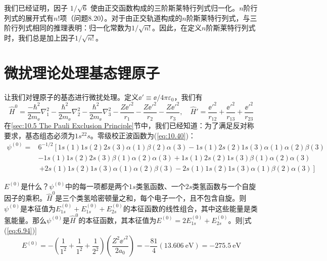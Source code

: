     我们已经证明，因子 $1/\sqrt{6}$ 使由正交函数构成的三阶斯莱特行列式归一化。$n$阶行列式的展开式有$n!$项（问题8.20）。对于由正交轨道构成的$n$阶斯莱特行列式，与三阶行列式相同的推理表明：归一化常数为$1/\sqrt{n!}$。因此，在定义$n$阶斯莱特行列式时，我们总是加上因子$1/\sqrt{n!}$。

\section{微扰理论处理基态锂原子}
\label{sec:10.7 Perturbation Treatment of the Lithium Ground State}

    让我们对锂原子的基态进行微扰处理。定义$\ee ' \equiv \ee / 4\pi \varepsilon_0$，我们有
    \begin{equation*}
        \hat{H}^0 = \frac{-\hbar^2}{2m_{\ee }}\nabla_1^2 - \frac{\hbar^2}{2m_{\ee }}\nabla_2^2 - \frac{\hbar^2}{2m_{\ee }}\nabla_3^2 - \frac{Z\ee '^2}{r_{1}} - \frac{Z\ee '^2}{r_{2}} - \frac{Z\ee '^2}{r_{3}}, \quad \hat{H}' = \frac{\ee '^2}{r_{12}} + \frac{\ee '^2}{r_{13}} + \frac{\ee '^2}{r_{23}}
    \end{equation*}
    在\ref{sec:10.5 The Pauli Exclusion Principle}节中，我们已经知道：为了满足反对称要求，基态组态必须为$1s^22s$。零级校正波函数为(\ref{eq:10.40})：
    \begin{equation}
        \begin{aligned}
            \psi^{\left(0\right)} = &6^{-1/2} \left[1s\left(1\right)1s\left(2\right)2s\left(3\right)\alpha\left(1\right)\beta\left(2\right)\alpha\left(3\right) - 1s\left(1\right)2s\left(2\right)1s\left(3\right)\alpha\left(1\right)\alpha\left(2\right)\beta\left(3\right)\right. \\
            &- 1s\left(1\right)1s\left(2\right)2s\left(3\right)\beta\left(1\right)\alpha\left(2\right)\alpha\left(3\right) + 1s\left(1\right)2s\left(2\right)1s\left(3\right)\beta\left(1\right)\alpha\left(2\right)\alpha\left(3\right) \\
            &\, \left. + 2s\left(1\right)1s\left(2\right)1s\left(3\right)\alpha\left(1\right)\alpha\left(2\right)\beta\left(3\right) - 2s\left(1\right)1s\left(2\right)1s\left(3\right)\alpha\left(1\right)\beta\left(2\right)\alpha\left(3\right)\right]
            \label{eq:10.48}
        \end{aligned}
    \end{equation}

    $E^{\left(0\right)}$是什么？$\psi^{\left(0\right)}$中的每一项都是两个$1s$类氢函数、一个$2s$类氢函数与一个自旋因子的乘积。$\hat{H}^0$是三个类氢哈密顿量之和，每个电子一个，且不包含自旋。则$\psi^{\left(0\right)}$是本征值为$E_{1s}^{\left(0\right)} + E_{1s}^{\left(0\right)} + E_{2s}^{\left(0\right)}$的本征函数的线性组合，其中这些能量是类氢能量。那么$\psi^{\left(0\right)}$是$\hat{H}^0$的本征函数，其本征值为$E^{\left(0\right)} = 2E_{1s}^{\left(0\right)} + E_{2s}^{\left(0\right)}$。则[式(\ref{eq:6.94})]
    \begin{equation}
        E^{\left(0\right)} = -\left(\frac{1}{1^2} + \frac{1}{1^2} + \frac{1}{2^2}\right) \left(\frac{Z^2\ee '^2}{2a_0}\right) = -\frac{81}{4}\left(13.606 \: \mathrm{eV} \right) = -275.5 \: \mathrm{eV}
        \label{eq:10.49}
    \end{equation}
    

